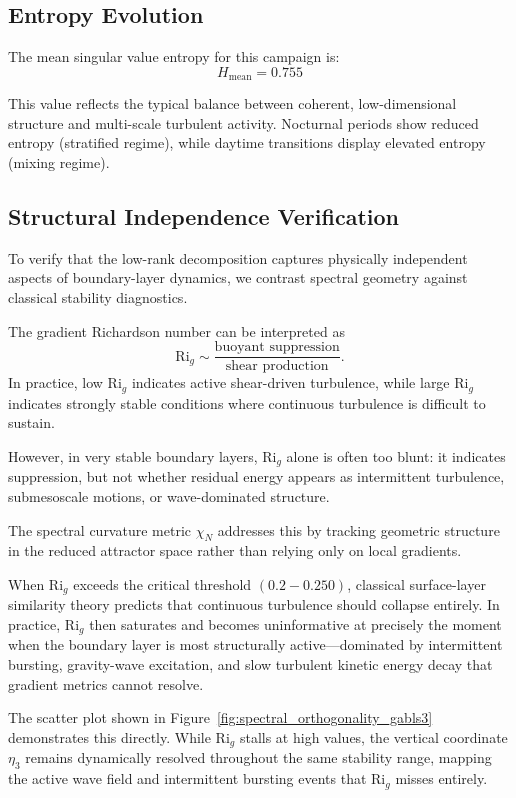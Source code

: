 \documentclass[11pt,a4paper]{article}
\begin{document}
\subsection{Entropy Evolution}

The mean singular value entropy for this campaign is:
\[
    H_{\text{mean}} = 0.755
\]

This value reflects the typical balance between coherent, low-dimensional structure and multi-scale turbulent activity. Nocturnal periods show reduced entropy (stratified regime), while daytime transitions display elevated entropy (mixing regime).

\subsection{Structural Independence Verification}

To verify that the low-rank decomposition captures physically independent aspects of boundary-layer dynamics, we contrast spectral geometry against classical stability diagnostics.

The gradient Richardson number can be interpreted as
\[
\mathrm{Ri}_g \sim \frac{\text{buoyant suppression}}{\text{shear production}}.
\]
In practice, low $\mathrm{Ri}_g$ indicates active shear-driven turbulence, while large $\mathrm{Ri}_g$ indicates strongly stable conditions where continuous turbulence is difficult to sustain.

However, in very stable boundary layers, $\mathrm{Ri}_g$ alone is often too blunt: it indicates suppression, but not whether residual energy appears as intermittent turbulence, submesoscale motions, or wave-dominated structure.

The spectral curvature metric $\chi_N$ addresses this by tracking geometric structure in the reduced attractor space rather than relying only on local gradients.

When $\mathrm{Ri}_g$ exceeds the critical threshold $(0.2-0.250)$, classical surface-layer similarity theory predicts that continuous turbulence should collapse entirely. In practice, $\mathrm{Ri}_g$ then saturates and becomes uninformative at precisely the moment when the boundary layer is most structurally active---dominated by intermittent bursting, gravity-wave excitation, and slow turbulent kinetic energy decay that gradient metrics cannot resolve.

The scatter plot shown in Figure~\ref{fig:spectral_orthogonality_gabls3} demonstrates this directly. While $\mathrm{Ri}_g$ stalls at high values, the vertical coordinate $\eta_3$ remains dynamically resolved throughout the same stability range, mapping the active wave field and intermittent bursting events that $\mathrm{Ri}_g$ misses entirely.
\end{document}

